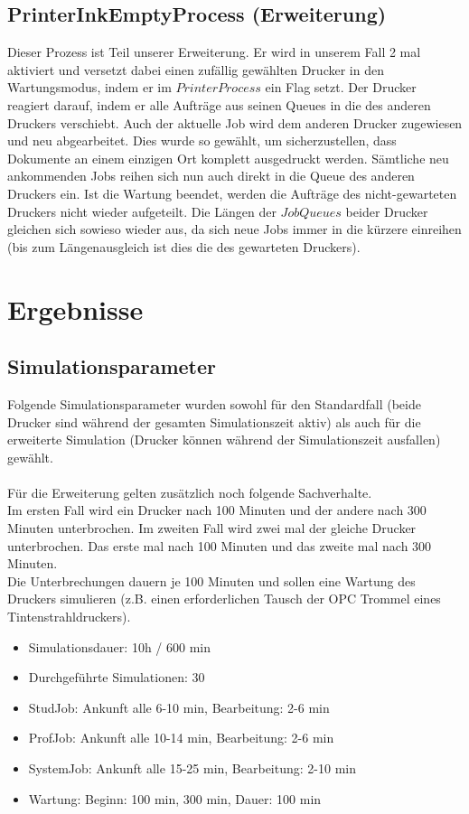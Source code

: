 \documentclass[12pt,a4paper]{article}
\begin{document}
	\subsection{PrinterInkEmptyProcess (Erweiterung)}
	Dieser Prozess ist Teil unserer Erweiterung. Er wird in unserem Fall 2 mal aktiviert und versetzt dabei einen zufällig gewählten Drucker in den Wartungsmodus, indem er im $PrinterProcess$ ein Flag setzt. 
	Der Drucker reagiert darauf, indem er alle Aufträge aus seinen Queues in die des anderen Druckers verschiebt. Auch der aktuelle Job wird dem anderen Drucker zugewiesen und neu abgearbeitet. Dies wurde 
	so gewählt, um sicherzustellen, dass Dokumente an einem einzigen Ort komplett ausgedruckt werden. Sämtliche neu ankommenden Jobs reihen sich nun auch direkt in die Queue des anderen Druckers
	ein. Ist die Wartung beendet, werden die Aufträge des nicht-gewarteten Druckers nicht wieder aufgeteilt. Die Längen der $JobQueues$ beider Drucker gleichen sich sowieso wieder aus, da sich neue Jobs
	immer in die kürzere einreihen (bis zum Längenausgleich ist dies die des gewarteten Druckers).
	
	\section{Ergebnisse}
	\subsection{Simulationsparameter}
	Folgende Simulationsparameter wurden sowohl für den Standardfall (beide Drucker sind während der gesamten Simulationszeit aktiv) als auch für die erweiterte Simulation (Drucker können während der
	Simulationszeit ausfallen) gewählt.\\
	\\
	Für die Erweiterung gelten zusätzlich noch folgende Sachverhalte.\\
	Im ersten Fall wird ein Drucker nach 100 Minuten und der andere nach 300 Minuten unterbrochen.
	Im zweiten Fall wird zwei mal der gleiche Drucker unterbrochen. Das erste mal nach 100 Minuten und das zweite mal nach 300 Minuten.\\
	Die Unterbrechungen dauern je 100 Minuten und sollen eine Wartung des Druckers simulieren (z.B. einen erforderlichen Tausch der OPC Trommel eines Tintenstrahldruckers).
	\\
	\begin{itemize}
		\item Simulationsdauer: 10h / 600 min
		\item Durchgeführte Simulationen: 30
		\item StudJob: Ankunft alle 6-10 min, Bearbeitung: 2-6 min
		\item ProfJob: Ankunft alle 10-14 min, Bearbeitung: 2-6 min
		\item SystemJob: Ankunft alle 15-25 min, Bearbeitung: 2-10 min
		\item Wartung: Beginn: 100 min, 300 min, Dauer: 100 min
	\end{itemize}	
		
\end{document}
